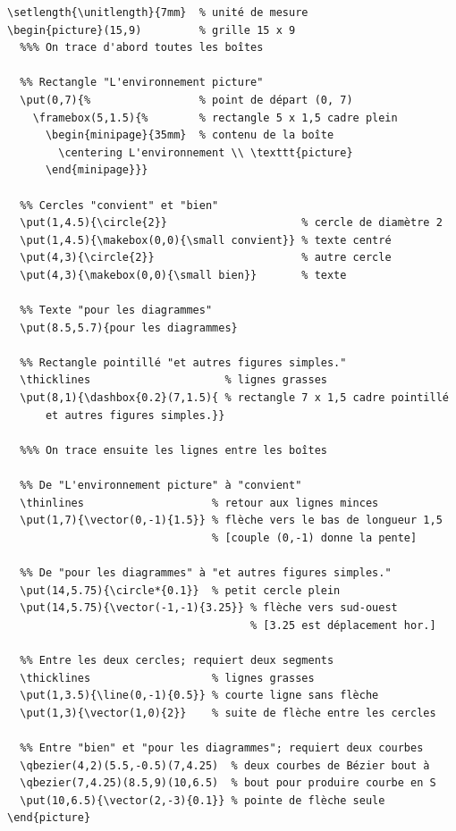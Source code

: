 \begingroup
  \small
\begin{lstlisting}
\setlength{\unitlength}{7mm}  % unité de mesure
\begin{picture}(15,9)         % grille 15 x 9
  %%% On trace d'abord toutes les boîtes

  %% Rectangle "L'environnement picture"
  \put(0,7){%                 % point de départ (0, 7)
    \framebox(5,1.5){%        % rectangle 5 x 1,5 cadre plein
      \begin{minipage}{35mm}  % contenu de la boîte
        \centering L'environnement \\ \texttt{picture}
      \end{minipage}}}

  %% Cercles "convient" et "bien"
  \put(1,4.5){\circle{2}}                     % cercle de diamètre 2
  \put(1,4.5){\makebox(0,0){\small convient}} % texte centré
  \put(4,3){\circle{2}}                       % autre cercle
  \put(4,3){\makebox(0,0){\small bien}}       % texte

  %% Texte "pour les diagrammes"
  \put(8.5,5.7){pour les diagrammes}

  %% Rectangle pointillé "et autres figures simples."
  \thicklines                     % lignes grasses
  \put(8,1){\dashbox{0.2}(7,1.5){ % rectangle 7 x 1,5 cadre pointillé
      et autres figures simples.}}

  %%% On trace ensuite les lignes entre les boîtes

  %% De "L'environnement picture" à "convient"
  \thinlines                    % retour aux lignes minces
  \put(1,7){\vector(0,-1){1.5}} % flèche vers le bas de longueur 1,5
                                % [couple (0,-1) donne la pente]

  %% De "pour les diagrammes" à "et autres figures simples."
  \put(14,5.75){\circle*{0.1}}  % petit cercle plein
  \put(14,5.75){\vector(-1,-1){3.25}} % flèche vers sud-ouest
                                      % [3.25 est déplacement hor.]

  %% Entre les deux cercles; requiert deux segments
  \thicklines                   % lignes grasses
  \put(1,3.5){\line(0,-1){0.5}} % courte ligne sans flèche
  \put(1,3){\vector(1,0){2}}    % suite de flèche entre les cercles

  %% Entre "bien" et "pour les diagrammes"; requiert deux courbes
  \qbezier(4,2)(5.5,-0.5)(7,4.25)  % deux courbes de Bézier bout à
  \qbezier(7,4.25)(8.5,9)(10,6.5)  % bout pour produire courbe en S
  \put(10,6.5){\vector(2,-3){0.1}} % pointe de flèche seule
\end{picture}
\end{lstlisting}
\endgroup

